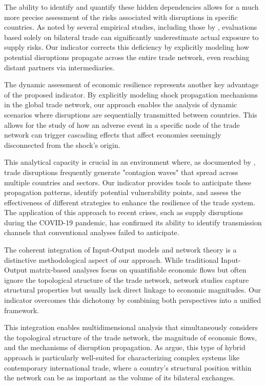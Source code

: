 \documentclass[final,1p,times,authoryear]{elsarticle}
\begin{document}
The ability to identify and quantify these hidden dependencies allows for a much more precise assessment of the risks associated with disruptions in specific countries. As noted by several empirical studies, including those by \citet{Vicard2023}, evaluations based solely on bilateral trade can significantly underestimate actual exposure to supply risks. Our indicator corrects this deficiency by explicitly modeling how potential disruptions propagate across the entire trade network, even reaching distant partners via intermediaries.

The dynamic assessment of economic resilience represents another key advantage of the proposed indicator. By explicitly modeling shock propagation mechanisms in the global trade network, our approach enables the analysis of dynamic scenarios where disruptions are sequentially transmitted between countries. This allows for the study of how an adverse event in a specific node of the trade network can trigger cascading effects that affect economies seemingly disconnected from the shock's origin.

This analytical capacity is crucial in an environment where, as documented by \citet{Baldwin2020}, trade disruptions frequently generate "contagion waves" that spread across multiple countries and sectors. Our indicator provides tools to anticipate these propagation patterns, identify potential vulnerability points, and assess the effectiveness of different strategies to enhance the resilience of the trade system. The application of this approach to recent crises, such as supply disruptions during the COVID-19 pandemic, has confirmed its ability to identify transmission channels that conventional analyses failed to anticipate.

The coherent integration of Input-Output models and network theory is a distinctive methodological aspect of our approach. While traditional Input-Output matrix-based analyses focus on quantifiable economic flows but often ignore the topological structure of the trade network, network studies capture structural properties but usually lack direct linkage to economic magnitudes. Our indicator overcomes this dichotomy by combining both perspectives into a unified framework.

This integration enables multidimensional analysis that simultaneously considers the topological structure of the trade network, the magnitude of economic flows, and the mechanisms of disruption propagation. As \citet{Cerina2015} argue, this type of hybrid approach is particularly well-suited for characterizing complex systems like contemporary international trade, where a country’s structural position within the network can be as important as the volume of its bilateral exchanges.
\end{document}
